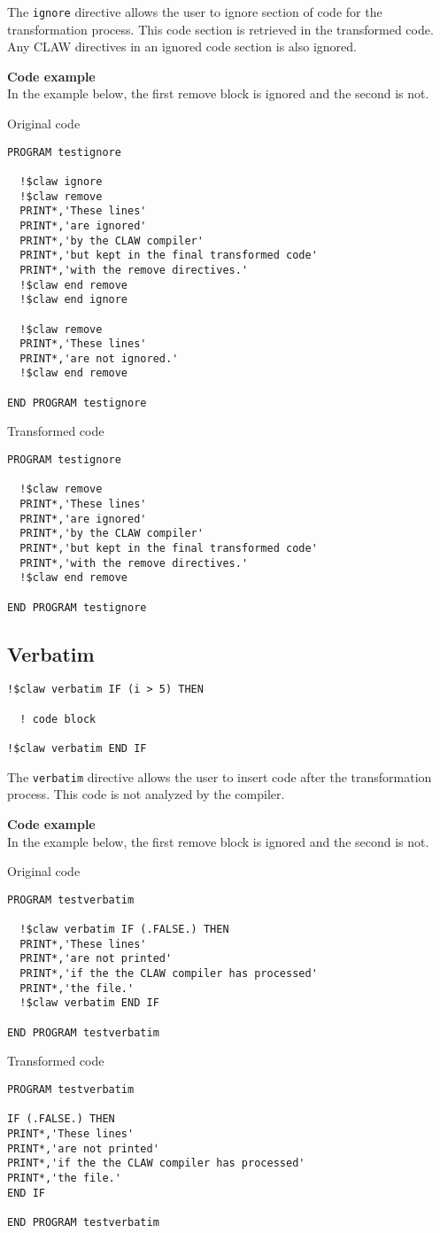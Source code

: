 The \lstinline!ignore! directive allows the user to ignore section of code
for the transformation process. This code section is retrieved in the 
transformed code. Any CLAW directives in an ignored code section is also
ignored.

\textbf{Code example}\\
\label{ignore1}
In the example below, the first remove block is ignored and the second is not.

Original code
\begin{lstlisting}
PROGRAM testignore

  !$claw ignore
  !$claw remove
  PRINT*,'These lines'
  PRINT*,'are ignored'
  PRINT*,'by the CLAW compiler'
  PRINT*,'but kept in the final transformed code'
  PRINT*,'with the remove directives.'
  !$claw end remove
  !$claw end ignore

  !$claw remove
  PRINT*,'These lines'
  PRINT*,'are not ignored.'
  !$claw end remove

END PROGRAM testignore
\end{lstlisting}

Transformed code
\begin{lstlisting}
PROGRAM testignore

  !$claw remove
  PRINT*,'These lines'
  PRINT*,'are ignored'
  PRINT*,'by the CLAW compiler'
  PRINT*,'but kept in the final transformed code'
  PRINT*,'with the remove directives.'
  !$claw end remove

END PROGRAM testignore
\end{lstlisting}

\subsection{Verbatim}
\begin{lstlisting}
!$claw verbatim IF (i > 5) THEN

  ! code block
  
!$claw verbatim END IF
\end{lstlisting}

The \lstinline!verbatim! directive allows the user to insert code after the
transformation process. This code is not analyzed by the compiler. 

\textbf{Code example}\\
\label{verbatim1}
In the example below, the first remove block is ignored and the second is not.

Original code
\begin{lstlisting}
PROGRAM testverbatim

  !$claw verbatim IF (.FALSE.) THEN
  PRINT*,'These lines'
  PRINT*,'are not printed'
  PRINT*,'if the the CLAW compiler has processed'
  PRINT*,'the file.'
  !$claw verbatim END IF

END PROGRAM testverbatim
\end{lstlisting}

Transformed code
\begin{lstlisting}
PROGRAM testverbatim

IF (.FALSE.) THEN
PRINT*,'These lines'
PRINT*,'are not printed'
PRINT*,'if the the CLAW compiler has processed'
PRINT*,'the file.'
END IF

END PROGRAM testverbatim
\end{lstlisting}
